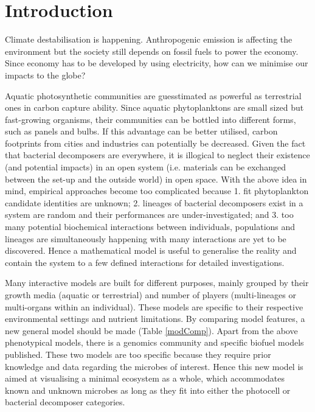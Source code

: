 \documentclass[../thesis.tex]{subfiles} %
\begin{document}
\section{Introduction}

Climate destabilisation is happening.\autocite{notz2016observed,schuur2015climate}  Anthropogenic emission is affecting the environment\autocite{notz2016observed} but the society still depends on fossil fuels to power the economy.\autocite{lotfalipour2010economic}  Since economy has to be developed by using electricity,\autocite{ferguson2000electricity} how can we minimise our impacts to the globe?

Aquatic photosynthetic communities are guesstimated as powerful as terrestrial ones in carbon capture ability.\autocite{SCHLESINGER2013341}  Since aquatic phytoplanktons are small sized but fast-growing organisms, their communities can be bottled into different forms, such as panels and bulbs\autocite{evanson_2019}.  If this advantage can be better utilised, carbon footprints from cities and industries can potentially be decreased.  Given the fact that bacterial decomposers are everywhere, it is illogical to neglect their existence (and potential impacts) in an open system (i.e. materials can be exchanged between the set-up and the outside world) in open space.  With the above idea in mind, empirical approaches become too complicated because 1. fit phytoplankton candidate identities are unknown; 2. lineages of bacterial decomposers exist in a system are random and their performances are under-investigated; and 3. too many potential biochemical interactions between individuals, populations and lineages are simultaneously happening with many interactions are yet to be discovered.  Hence a mathematical model is useful to generalise the reality and contain the system to a few defined interactions for detailed investigations.

Many interactive models are built for different purposes, mainly grouped by their growth media (aquatic or terrestrial) and number of players (multi-lineages or multi-organs within an individual).  These models are specific to their respective environmental settings and nutrient limitations.  By comparing model features, a new general model should be made (Table \ref{modComp}).  Apart from the above phenotypical models, there is a genomics community\autocite{harcombe2014metabolic} and specific biofuel\autocite{kirthiga2014mathematical} models published.  These two models are too specific because they require prior knowledge and data regarding the microbes of interest.  Hence this new model is aimed at visualising a minimal ecosystem as a whole, which accommodates known and unknown microbes as long as they fit into either the photocell or bacterial decomposer categories.
\end{document}
